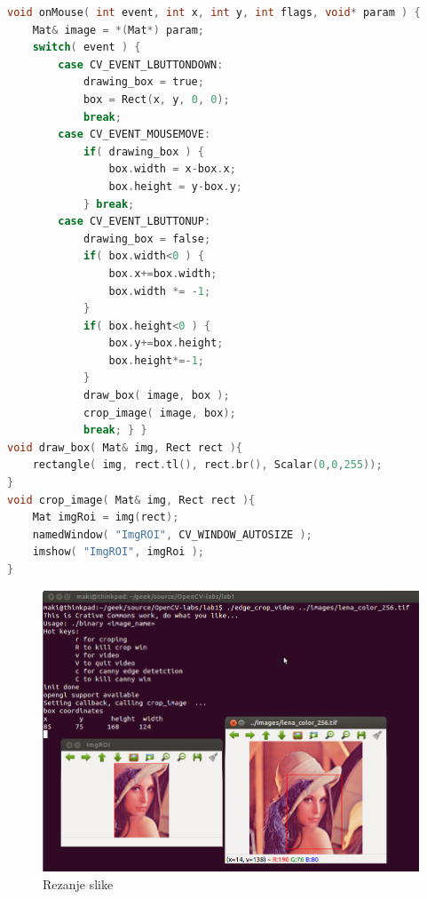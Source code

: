 \begin{lstlisting}[language=C,caption={Rezanje slike}]
void onMouse( int event, int x, int y, int flags, void* param ) {
    Mat& image = *(Mat*) param;
    switch( event ) {
        case CV_EVENT_LBUTTONDOWN:
            drawing_box = true;
            box = Rect(x, y, 0, 0);
            break;
        case CV_EVENT_MOUSEMOVE: 
            if( drawing_box ) {
                box.width = x-box.x;
                box.height = y-box.y;
            } break;
        case CV_EVENT_LBUTTONUP: 
            drawing_box = false;
            if( box.width<0 ) {
                box.x+=box.width;
                box.width *= -1;
            }
            if( box.height<0 ) {
                box.y+=box.height;
                box.height*=-1;
            }
            draw_box( image, box );
            crop_image( image, box);
            break; } } 
void draw_box( Mat& img, Rect rect ){
    rectangle( img, rect.tl(), rect.br(), Scalar(0,0,255));
}
void crop_image( Mat& img, Rect rect ){
    Mat imgRoi = img(rect);
    namedWindow( "ImgROI", CV_WINDOW_AUTOSIZE );
    imshow( "ImgROI", imgRoi );
}
\end{lstlisting}

\begin{figure}[h]
\centering
\includegraphics[scale=0.4]{images/lab1-02-crop.png}
\caption{Rezanje slike}
\label{fig:lab1-02-crop}
\end{figure}

\newpage

